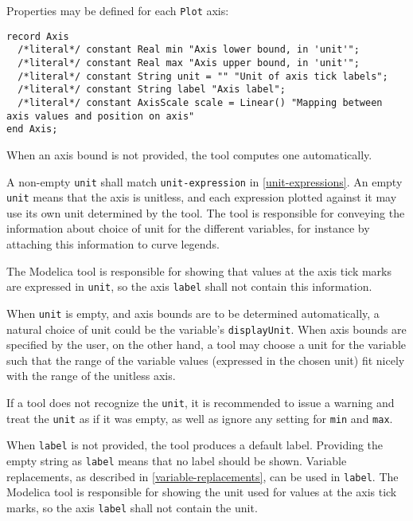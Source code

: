 Properties may be defined for each \lstinline!Plot! axis:
\begin{lstlisting}[language=modelica]
record Axis
  /*literal*/ constant Real min "Axis lower bound, in 'unit'";
  /*literal*/ constant Real max "Axis upper bound, in 'unit'";
  /*literal*/ constant String unit = "" "Unit of axis tick labels";
  /*literal*/ constant String label "Axis label";
  /*literal*/ constant AxisScale scale = Linear() "Mapping between axis values and position on axis"
end Axis;
\end{lstlisting}

When an axis bound is not provided, the tool computes one automatically.

A non-empty \lstinline!unit! shall match \lstinline[language=grammar]!unit-expression! in \cref{unit-expressions}.
An empty \lstinline!unit! means that the axis is unitless, and each expression plotted against it may use its own unit determined by the tool.
The tool is responsible for conveying the information about choice of unit for the different variables, for instance by attaching this information to curve legends.

The Modelica tool is responsible for showing that values at the axis tick marks are expressed in \lstinline!unit!, so the axis \lstinline!label! shall not contain this information.

\begin{nonnormative}
When \lstinline!unit! is empty, and axis bounds are to be determined automatically, a natural choice of unit could be the variable's \lstinline!displayUnit!.
When axis bounds are specified by the user, on the other hand, a tool may choose a unit for the variable such that the range of the variable values (expressed in the chosen unit) fit nicely with the range of the unitless axis.
\end{nonnormative}

If a tool does not recognize the \lstinline!unit!, it is recommended to issue a warning and treat the \lstinline!unit! as if it was empty, as well as ignore any setting for \lstinline!min! and \lstinline!max!.

When \lstinline!label! is not provided, the tool produces a default label.
Providing the empty string as \lstinline!label! means that no label should be shown.
Variable replacements, as described in \cref{variable-replacements}, can be used in \lstinline!label!.
The Modelica tool is responsible for showing the unit used for values at the axis tick marks, so the axis \lstinline!label! shall not contain the unit.

